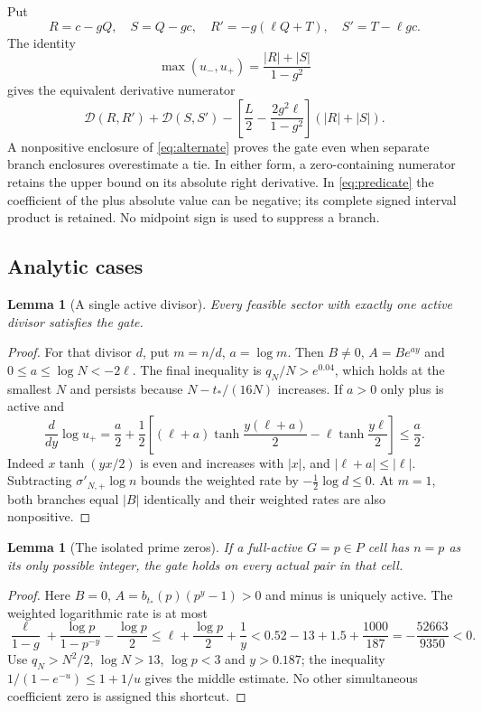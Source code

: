 \documentclass[11pt]{article}
\newtheorem{lemma}[theorem]{Lemma}
\theoremstyle{remark}
\newcommand{\tstar}{t_*}
\numberwithin{equation}{section}
\begin{document}
Put
\[
 R=c-gQ,\quad S=Q-gc,\quad R'=-g(\ell Q+T),\quad S'=T-\ell gc.
\]
The identity
\[
 \max(u_-,u_+)=\frac{|R|+|S|}{1-g^2}
\]
gives the equivalent derivative numerator
\begin{equation}\label{eq:alternate}
 \mathcal D(R,R')+\mathcal D(S,S')-
 \left[\frac L2-\frac{2g^2\ell}{1-g^2}\right](|R|+|S|).
\end{equation}
A nonpositive enclosure of \eqref{eq:alternate} proves the gate even
when separate branch enclosures overestimate a tie. In either form,
a zero-containing numerator retains the upper bound on its absolute
right derivative. In \eqref{eq:predicate} the coefficient of the plus
absolute value can be negative; its complete signed interval product
is retained. No midpoint sign is used to suppress a branch.

\subsection{Analytic cases}

\begin{lemma}[A single active divisor]\label{lem:single}
Every feasible sector with exactly one active divisor satisfies the gate.
\end{lemma}
\begin{proof}
For that divisor $d$, put $m=n/d$, $a=\log m$. Then $B\ne0$,
$A=B e^{ay}$ and $0\le a\le\log N<-2\ell$. The final inequality is
$q_N/N>e^{0.04}$, which holds at the smallest $N$ and persists because
$N-\tstar/(16N)$ increases. If $a>0$ only plus is active and
\[
 \frac{d}{dy}\log u_+=\frac a2+\frac12
 \left[(\ell+a)\tanh\frac{y(\ell+a)}2
       -\ell\tanh\frac{y\ell}2\right]\le\frac a2.
\]
Indeed $x\tanh(yx/2)$ is even and increases with $|x|$, and
$|\ell+a|\le|\ell|$. Subtracting $\sigma'_{N,+}\log n$ bounds the
weighted rate by $-\tfrac12\log d\le0$. At $m=1$, both branches equal
$|B|$ identically and their weighted rates are also nonpositive.
\end{proof}

\begin{lemma}[The isolated prime zeros]\label{lem:prime}
If a full-active $G=p\in P$ cell has $n=p$ as its only possible integer,
the gate holds on every actual pair in that cell.
\end{lemma}
\begin{proof}
Here $B=0$, $A=b_{\tstar}(p)(p^y-1)>0$ and minus is uniquely active.
The weighted logarithmic rate is at most
\[
 \frac{\ell}{1-g}+\frac{\log p}{1-p^{-y}}-\frac{\log p}{2}
 \le\ell+\frac{\log p}{2}+\frac1y
 <0.52-13+1.5+\frac{1000}{187}
 =-\frac{52663}{9350}<0.
\]
Use $q_N>N^2/2$, $\log N>13$, $\log p<3$ and $y>0.187$; the
inequality $1/(1-e^{-u})\le1+1/u$ gives the middle estimate.
No other simultaneous coefficient zero is assigned this shortcut.
\end{proof}
\end{document}
